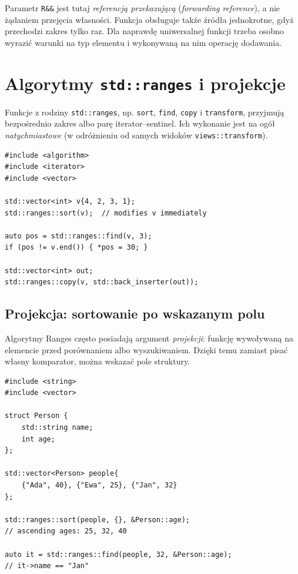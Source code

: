 Parametr \texttt{R\&\&} jest tutaj \emph{referencją przekazującą}
(\textit{forwarding reference}), a nie żądaniem przejęcia własności.
Funkcja obsługuje także źródła jednokrotne, gdyż przechodzi zakres tylko
raz. Dla naprawdę uniwersalnej funkcji trzeba osobno wyrazić warunki
na typ elementu i wykonywaną na nim operację dodawania.

\section{Algorytmy \texttt{std::ranges} i projekcje}
\label{sec:cpp8-algorithms}

Funkcje z rodziny \texttt{std::ranges}, np. \texttt{sort},
\texttt{find}, \texttt{copy} i \texttt{transform}, przyjmują
bezpośrednio zakres albo parę iterator--sentinel.
Ich wykonanie jest na ogół \emph{natychmiastowe} (w odróżnieniu od
samych widoków \texttt{views::transform}).

\begin{lstlisting}
#include <algorithm>
#include <iterator>
#include <vector>

std::vector<int> v{4, 2, 3, 1};
std::ranges::sort(v);  // modifies v immediately

auto pos = std::ranges::find(v, 3);
if (pos != v.end()) { *pos = 30; }

std::vector<int> out;
std::ranges::copy(v, std::back_inserter(out));
\end{lstlisting}

\subsection{Projekcja: sortowanie po wskazanym polu}

Algorytmy Ranges często posiadają argument \emph{projekcji}: funkcję
wywoływaną na elemencie przed porównaniem albo wyszukiwaniem. Dzięki
temu zamiast pisać własny komparator, można wskazać pole struktury.

\begin{lstlisting}
#include <string>
#include <vector>

struct Person {
    std::string name;
    int age;
};

std::vector<Person> people{
    {"Ada", 40}, {"Ewa", 25}, {"Jan", 32}
};

std::ranges::sort(people, {}, &Person::age);
// ascending ages: 25, 32, 40

auto it = std::ranges::find(people, 32, &Person::age);
// it->name == "Jan"
\end{lstlisting}

